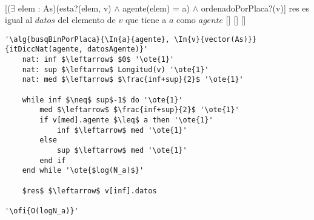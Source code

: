 ~


[($\exists$ elem : As)(esta?(elem, v) $\land$ agente(elem) = a) $\land$ ordenadoPorPlaca?(v)]
{res es igual al $datos$ del elemento de $v$ que tiene a $a$ como $agente$}
[]
[]
[]

\begin{lstlisting}[mathescape]
'\alg{busqBinPorPlaca}{\In{a}{agente}, \In{v}{vector(As)}}{itDiccNat(agente, datosAgente)}'
	nat: inf $\leftarrow$ $0$ '\ote{1}'
	nat: sup $\leftarrow$ Longitud(v) '\ote{1}'
	nat: med $\leftarrow$ $\frac{inf+sup}{2}$ '\ote{1}'

	while inf $\neq$ sup$-1$ do '\ote{1}'
		med $\leftarrow$ $\frac{inf+sup}{2}$ '\ote{1}'
		if v[med].agente $\leq$ a then '\ote{1}'
			inf $\leftarrow$ med '\ote{1}'
		else
			sup $\leftarrow$ med '\ote{1}'
		end if
	end while '\ote{$log(N_a)$}'

	$res$ $\leftarrow$ v[inf].datos

'\ofi{O(logN_a)}'
\end{lstlisting}
